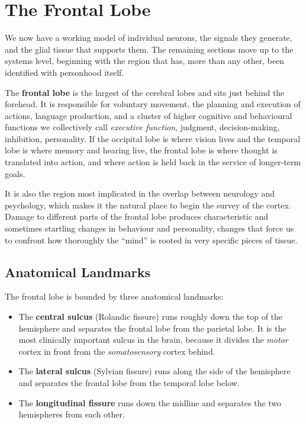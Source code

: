 \documentclass[11pt]{article}
\begin{document}
\section{The Frontal Lobe}

We now have a working model of individual neurons, the signals they generate, and the glial tissue that supports them. The remaining sections move up to the systems level, beginning with the region that has, more than any other, been identified with personhood itself.

The \textbf{frontal lobe} is the largest of the cerebral lobes and sits just behind the forehead. It is responsible for voluntary movement, the planning and execution of actions, language production, and a cluster of higher cognitive and behavioural functions we collectively call \textit{executive function}, judgment, decision-making, inhibition, personality. If the occipital lobe is where vision lives and the temporal lobe is where memory and hearing live, the frontal lobe is where thought is translated into action, and where action is held back in the service of longer-term goals.

It is also the region most implicated in the overlap between neurology and psychology, which makes it the natural place to begin the survey of the cortex. Damage to different parts of the frontal lobe produces characteristic and sometimes startling changes in behaviour and personality, changes that force us to confront how thoroughly the ``mind'' is rooted in very specific pieces of tissue.

\subsection{Anatomical Landmarks}

The frontal lobe is bounded by three anatomical landmarks:

\begin{itemize}
    \item The \textbf{central sulcus} (Rolandic fissure) runs roughly down the top of the hemisphere and separates the frontal lobe from the parietal lobe. It is the most clinically important sulcus in the brain, because it divides the \textit{motor} cortex in front from the \textit{somatosensory} cortex behind.
    \item The \textbf{lateral sulcus} (Sylvian fissure) runs along the side of the hemisphere and separates the frontal lobe from the temporal lobe below.
    \item The \textbf{longitudinal fissure} runs down the midline and separates the two hemispheres from each other.
\end{itemize}
\end{document}
